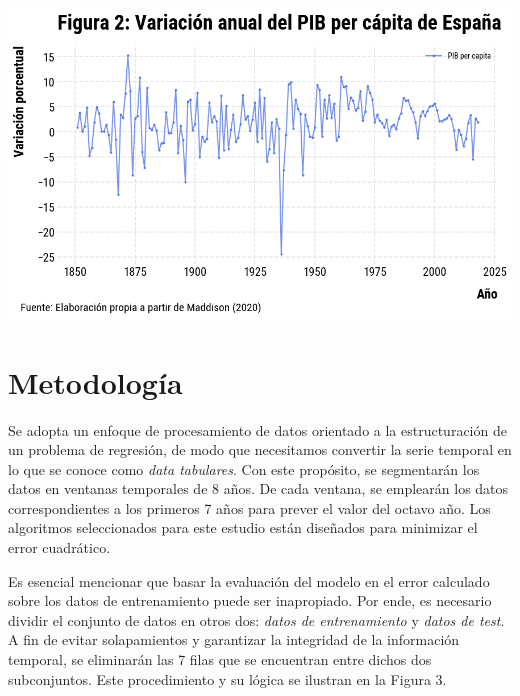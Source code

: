 \documentclass[12pt]{article}
\begin{document}
\begin{center}
\includegraphics[scale=0.57]{fig_2_varpibpc}
\end{center}


\section{Metodología}

Se adopta un enfoque de procesamiento de datos orientado a la estructuración de un problema de regresión, de modo que necesitamos convertir la serie temporal en lo que se conoce como \textit{data tabulares}. Con este propósito, se segmentarán los datos en ventanas temporales de 8 años. De cada ventana, se emplearán los datos correspondientes a los primeros 7 años para prever el valor del octavo año. Los algoritmos seleccionados para este estudio están diseñados para minimizar el error cuadrático.


Es esencial mencionar que basar la evaluación del modelo en el error calculado sobre los datos de entrenamiento puede ser inapropiado. Por ende, es necesario dividir el conjunto de datos en otros dos: \textit{datos de entrenamiento} y \textit{datos de test}. A fin de evitar solapamientos y garantizar la integridad de la información temporal, se eliminarán las 7 filas que se encuentran entre dichos dos subconjuntos. Este procedimiento y su lógica se ilustran en la Figura 3.

\begin{figure}[H]
\end{figure}
\end{document}
